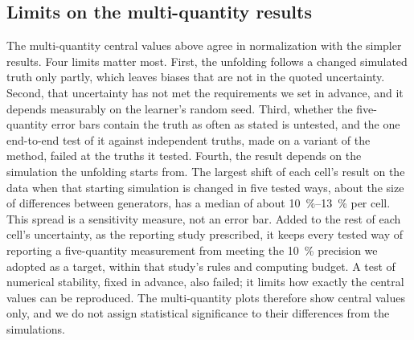 \subsection*{Limits on the multi-quantity results}

The multi-quantity central values above agree in normalization with the simpler results. Four limits matter most. First, the unfolding follows a changed simulated truth only partly, which leaves biases that are not in the quoted uncertainty. Second, that uncertainty has not met the requirements we set in advance, and it depends measurably on the learner's random seed. Third, whether the five-quantity error bars contain the truth as often as stated is untested, and the one end-to-end test of it against independent truths, made on a variant of the method, failed at the truths it tested. Fourth, the result depends on the simulation the unfolding starts from. The largest shift of each cell's result on the data when that starting simulation is changed in five tested ways, about the size of differences between generators, has a median of about \SIrange{10}{13}{\percent} per cell. This spread is a sensitivity measure, not an error bar. Added to the rest of each cell's uncertainty, as the reporting study prescribed, it keeps every tested way of reporting a five-quantity measurement from meeting the \SI{10}{\percent} precision we adopted as a target, within that study's rules and computing budget. A test of numerical stability, fixed in advance, also failed; it limits how exactly the central values can be reproduced. The multi-quantity plots therefore show central values only, and we do not assign statistical significance to their differences from the simulations.
